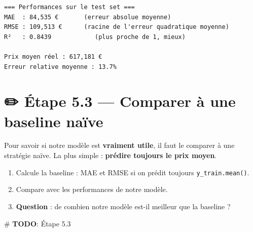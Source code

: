 \documentclass[
  french,
  11pt,
  a4paper,
]{scrbook}
\newenvironment{Shaded}{}{}
\newcommand{\AlertTok}[1]{\textcolor[rgb]{1.00,0.33,0.33}{\textbf{#1}}}
\newcommand{\CommentTok}[1]{\textcolor[rgb]{0.42,0.45,0.49}{#1}}
\providecommand{\tightlist}{%
  \setlength{\itemsep}{0pt}\setlength{\parskip}{0pt}}
\begin{document}
\begin{tcolorbox}
\begin{verbatim}
=== Performances sur le test set ===
MAE  : 84,535 €       (erreur absolue moyenne)
RMSE : 109,513 €      (racine de l'erreur quadratique moyenne)
R²   : 0.8439            (plus proche de 1, mieux)

Prix moyen réel : 617,181 €
Erreur relative moyenne : 13.7%
\end{verbatim}

\end{tcolorbox}

\section{✏️ Étape 5.3 --- Comparer à une baseline
naïve}\label{uxe9tape-5.3-comparer-uxe0-une-baseline-nauxefve}

\begin{tcolorbox}[enhanced jigsaw, arc=.35mm, bottomrule=.15mm, bottomtitle=1mm, breakable, colback=white, colbacktitle=quarto-callout-note-color!10!white, colframe=quarto-callout-note-color-frame, coltitle=black, left=2mm, leftrule=.75mm, opacityback=0, opacitybacktitle=0.6, rightrule=.15mm, title={📝 À faire}, titlerule=0mm, toprule=.15mm, toptitle=1mm]

Pour savoir si notre modèle est \textbf{vraiment utile}, il faut le
comparer à une stratégie naïve. La plus simple : \textbf{prédire
toujours le prix moyen}.

\begin{enumerate}
\def\labelenumi{\arabic{enumi}.}
\tightlist
\item
  Calcule la baseline : MAE et RMSE si on prédit toujours
  \texttt{y\_train.mean()}.
\item
  Compare avec les performances de notre modèle.
\item
  \textbf{Question} : de combien notre modèle est-il meilleur que la
  baseline ?
\end{enumerate}

\end{tcolorbox}

\begin{Shaded}
\begin{Highlighting}[]
\CommentTok{\# }\AlertTok{TODO}\CommentTok{: Étape 5.3}
\end{Highlighting}
\end{Shaded}
\end{document}
